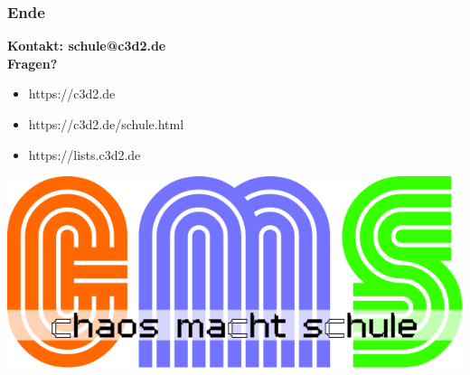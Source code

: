 \documentclass[12pt]{beamer}
\begin{document}
\begin{frame}
	\frametitle{Ende}
	\begin{center}
		\textbf{Kontakt: schule@c3d2.de} \\
		\textbf{Fragen?} 
	\end{center}
	\begin{itemize}
		\item<1-> https://c3d2.de
		\item<2-> https://c3d2.de/schule.html
		\item<4-> https://lists.c3d2.de
	\end{itemize}
\end{frame}

\begin{frame}
	\begin{center}
    	\includegraphics[height=0.5\textheight]{img//cms-text.png}
    \end{center}
\end{frame}
\end{document}
